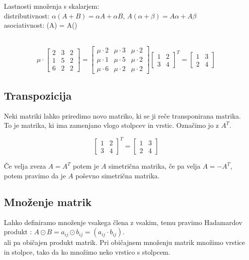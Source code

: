 \documentclass[12pt]{report}
\begin{document}
Lastnosti množenja s skalarjem:\\
distributivnost: $\alpha(A+B)=\alpha A+ \alpha B$, $A(\alpha+\beta)=A\alpha+A\beta$\\
asociativnost: (A) = A()\\\


\[\mu\cdot \begin{bmatrix} 2&  3&2 \\  1&  5&2 \\  6&  2&2 \end{bmatrix}=\begin{bmatrix}\mu\cdot 2 &\mu\cdot 3 &\mu\cdot 2 \\ \mu\cdot 1 &\mu\cdot 5 &\mu\cdot 2 \\ \mu\cdot 6 &\mu\cdot 2 &\mu\cdot 2\end{bmatrix}
\begin{bmatrix}1 &2 \\ 3 &4 \end{bmatrix}^T =\begin{bmatrix}1 &3 \\ 2 &4 \end{bmatrix}\]


\pagebreak

\subsection*{Transpozicija}
Neki matriki lahko priredimo novo matriko, ki se ji reče transponirana matrika.
To je matrika, ki ima zamenjano vlogo stolpcev in vrstic. Označimo jo z $A^T$.

\[ \begin{bmatrix} 1 & 2 \\ 3 & 4 \end{bmatrix}^T = \begin{bmatrix} 1 & 3 \\ 2 & 4 \end{bmatrix}\]

Če velja zveza $A = A^T$ potem je $A$ simetrična matrika, če pa velja $A = -A^T$, potem pravimo da je $A$ poševno simetrična matrika. 




\subsection*{Množenje matrik}

Lahko definiramo množenje vsakega člena z vsakim, temu pravimo Hadamardov produkt : $ A \odot B = a_{ij} \odot b_{ij} = (a_{ij} \cdot b_{ij})$.\\
ali pa običajen produkt matrik.
Pri običajnem množenju matrik množimo vrstice in stolpce, tako da ko množimo neko vrstico s stolpcem.\\\
\end{document}
